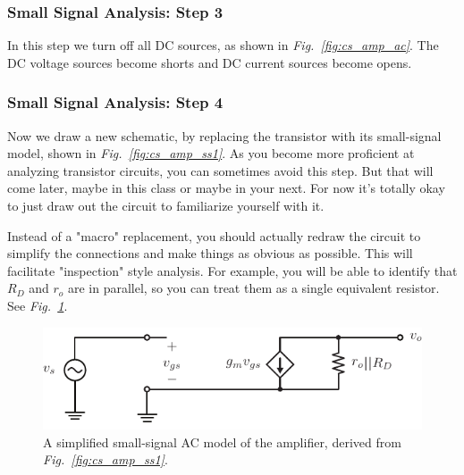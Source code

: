 \subsubsection{Small Signal Analysis:  Step 3}
In this step we turn off all DC sources, as shown in \emph{Fig.~\ref{fig:cs_amp_ac}}.  The DC voltage sources become shorts and DC current sources become opens.
\subsubsection{Small Signal Analysis:  Step 4}
Now we draw a new schematic, by replacing the transistor with its small-signal model, shown in \emph{Fig.~\ref{fig:cs_amp_ss1}}.  As you become more proficient at analyzing transistor circuits, you can sometimes avoid this step. But that will come later, maybe in this class or maybe in your next.  For now it's totally okay to just draw out the circuit to familiarize yourself with it.

Instead of a "macro" replacement, you should actually redraw the circuit to simplify the connections and make things as obvious as possible. This will facilitate "inspection" style analysis. For example, you will be able to identify that $R_D$ and $r_o$ are in parallel, so you can treat them as a single equivalent resistor.  See \emph{Fig.~\ref{fig:cs_amp_ss2}}.
\newpage
\begin{figure}[t]
\centering
\includegraphics[scale=1.5]{cs_amp_ss2}
\caption{A simplified small-signal AC model of the amplifier, derived from \emph{Fig.~\ref{fig:cs_amp_ss1}}.} \label{fig:cs_amp_ss2}
\end{figure}

